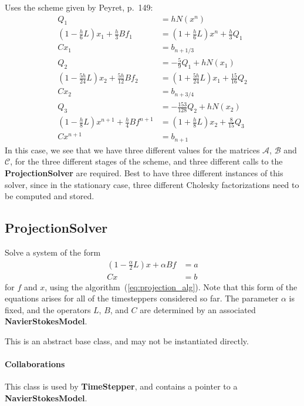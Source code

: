 \documentclass[11pt]{article}
\def\class#1{{\bf #1}} %
\begin{document}
Uses the scheme given by Peyret, p.~149\cite{Peyret}:
\begin{align}
	Q_1 &= hN(x^n)\\
	(1-\frac{h}{6}L)x_1 + \frac{h}{3}Bf_1 &= (1+\frac{h}{6}L)x^n + \frac{h}{3}Q_1\\
	Cx_1 &= b_{n+1/3}\\
	Q_2 &= -\frac{5}{9} Q_1 + hN(x_1)\\
	(1-\frac{5h}{24}L)x_2 + \frac{5h}{12}Bf_2 &= (1+\frac{5h}{24}L)x_1 + \frac{15}{16}Q_2\\
	Cx_2 &= b_{n+3/4}\\
	Q_3 &= -\frac{153}{128} Q_2 + hN(x_2)\\
	(1-\frac{h}{8}L)x^{n+1} + \frac{h}{4}Bf^{n+1} &= (1+\frac{h}{8}L)x_2 + \frac{8}{15}Q_3\\
	Cx^{n+1} &= b_{n+1}
\end{align}
In this case, we see that we have three different values for the matrices $\mathcal{A}$, $\mathcal{B}$ and $\mathcal{C}$, for the three different stages of the scheme, and three different calls to the \class{ProjectionSolver} are required.  Best to have three different instances of this solver, since in the stationary case, three different Cholesky factorizations need to be computed and stored.

\subsection{ProjectionSolver}
Solve a system of the form
\begin{equation}
\begin{aligned}
	(1 - \frac{\alpha}{2}L)x + \alpha Bf &= a\\
	Cx &= b
\end{aligned}
\label{eq:projection_specific}
\end{equation}
for $f$ and $x$, using the algorithm~(\ref{eq:projection_alg}).  Note that this form of the equations arises for all of the timesteppers considered so far.  The parameter $\alpha$ is fixed, and the operators $L$, $B$, and $C$ are determined by an associated \class{NavierStokesModel}.

This is an abstract base class, and may not be instantiated directly.

\paragraph{Collaborations}
This class is used by \class{TimeStepper}, and contains a pointer to a \class{NavierStokesModel}.
\end{document}

